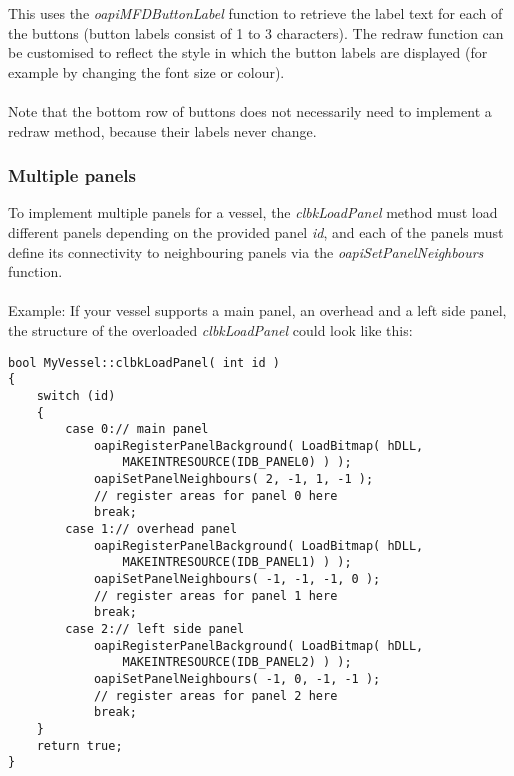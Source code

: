\documentclass[Orbiter Developer Manual.tex]{subfiles}
\begin{document}
\noindent
This uses the \textit{oapiMFDButtonLabel} function to retrieve the label text for each of the buttons (button labels consist of 1 to 3 characters). The redraw function can be customised to reflect the style in which the button labels are displayed (for example by changing the font size or colour).\\
\\
Note that the bottom row of buttons does not necessarily need to implement a redraw method, because their labels never change.


\subsubsection{Multiple panels}
To implement multiple panels for a vessel, the \textit{clbkLoadPanel} method must load different panels depending on the provided panel \textit{id}, and each of the panels must define its connectivity to neighbouring panels via the \textit{oapiSetPanelNeighbours} function.\\
\\
Example: If your vessel supports a main panel, an overhead and a left side panel, the structure of the overloaded \textit{clbkLoadPanel} could look like this:

\begin{lstlisting}
bool MyVessel::clbkLoadPanel( int id )
{
	switch (id)
	{
		case 0:// main panel
			oapiRegisterPanelBackground( LoadBitmap( hDLL,
				MAKEINTRESOURCE(IDB_PANEL0) ) );
			oapiSetPanelNeighbours( 2, -1, 1, -1 );
			// register areas for panel 0 here
			break;
		case 1:// overhead panel
			oapiRegisterPanelBackground( LoadBitmap( hDLL,
				MAKEINTRESOURCE(IDB_PANEL1) ) );
			oapiSetPanelNeighbours( -1, -1, -1, 0 );
			// register areas for panel 1 here
			break;
		case 2:// left side panel
			oapiRegisterPanelBackground( LoadBitmap( hDLL,
				MAKEINTRESOURCE(IDB_PANEL2) ) );
			oapiSetPanelNeighbours( -1, 0, -1, -1 );
			// register areas for panel 2 here
			break;
	}
	return true;
}
\end{lstlisting}
\end{document}
